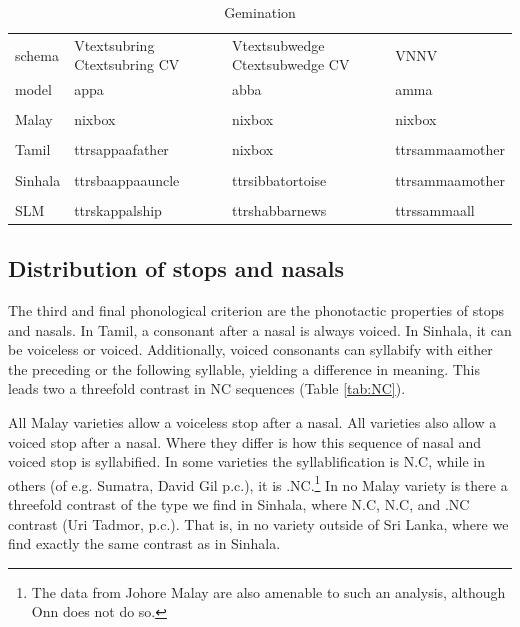 \documentclass[a4paper,10pt]{article}
\begin{document}
\begin{table}
\begin{tabular}{llll}

schema &    Vtextsubring Ctextsubring CV & Vtextsubwedge Ctextsubwedge CV & VNNV \\
%
model &  appa & abba & amma  \\\\
%
Malay  & nixbox & nixbox & nixbox  \\\\
%
Tamil &  ttrs{appaa}{father} & nixbox & ttrs{ammaa}{mother}  \\\\
%
Sinhala & ttrs{baappaa}{uncle} & ttrs{ibba}{tortoise} & ttrs{ammaa}{mother} \\\\
%
SLM & ttrs{kappal}{ship} & ttrs{habbar}{news} & ttrs{samma}{all} \\
\end{tabular}
\caption{Gemination}
\label{tab:gemination}
\end{table} 



\subsection{Distribution of stops and nasals}
The third and final phonological criterion are the phonotactic properties of stops and nasals. In Tamil, a consonant after a nasal is always voiced. In Sinhala, it can be voiceless or voiced. Additionally, voiced consonants can syllabify with either the preceding or the following syllable, yielding a difference in meaning. This leads two a threefold contrast in NC sequences (Table \ref{tab:NC}). 

All Malay varieties allow a voiceless stop after a nasal. All varieties also allow a voiced stop after a nasal. Where they differ is how this sequence of nasal and voiced stop is syllabified. In some varieties the syllablification is N.\textsubwedge C, while in others (of e.g. Sumatra, David Gil p.c.), it is .N\textsubwedge C.\footnote{The data from Johore Malay \citep{Onn1980} are also amenable to such an analysis, although Onn does not do so.} In no Malay variety is there a threefold contrast of the type we find in Sinhala, where N.\textsubring C, N.\textsubwedge C, and .N\textsubwedge C contrast (Uri Tadmor, p.c.). That is, in no variety outside of Sri Lanka, where we find exactly the same contrast as in Sinhala.
 
\end{document}

